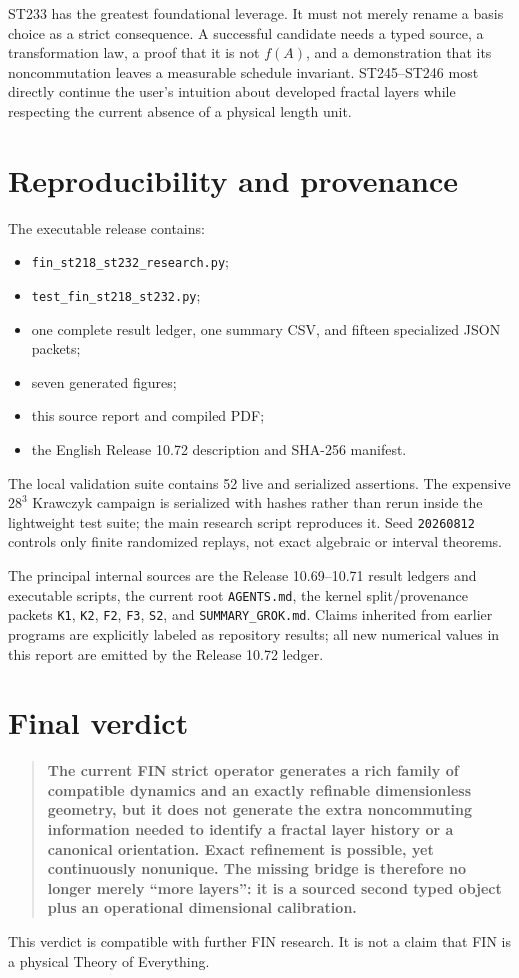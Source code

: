 \documentclass[11pt,a4paper]{article}
\begin{document}
ST233 has the greatest foundational leverage. It must not merely rename a basis choice as a
strict consequence. A successful candidate needs a typed source, a transformation law, a
proof that it is not $f(A)$, and a demonstration that its noncommutation leaves a measurable
schedule invariant. ST245--ST246 most directly continue the user's intuition about developed
fractal layers while respecting the current absence of a physical length unit.

\section{Reproducibility and provenance}

The executable release contains:
\begin{itemize}
\item \texttt{fin\_st218\_st232\_research.py};
\item \texttt{test\_fin\_st218\_st232.py};
\item one complete result ledger, one summary CSV, and fifteen specialized JSON packets;
\item seven generated figures;
\item this source report and compiled PDF;
\item the English Release 10.72 description and SHA-256 manifest.
\end{itemize}

The local validation suite contains 52 live and serialized assertions. The expensive
$28^3$ Krawczyk campaign is serialized with hashes rather than rerun inside the lightweight
test suite; the main research script reproduces it. Seed \texttt{20260812} controls only
finite randomized replays, not exact algebraic or interval theorems.

The principal internal sources are the Release 10.69--10.71 result ledgers and executable
scripts, the current root \texttt{AGENTS.md}, the kernel split/provenance packets
\texttt{K1}, \texttt{K2}, \texttt{F2}, \texttt{F3}, \texttt{S2}, and
\texttt{SUMMARY\_GROK.md}. Claims inherited from earlier programs are explicitly labeled as
repository results; all new numerical values in this report are emitted by the Release
10.72 ledger.

\section{Final verdict}

\begin{quote}
\textbf{The current FIN strict operator generates a rich family of compatible dynamics and
an exactly refinable dimensionless geometry, but it does not generate the extra
noncommuting information needed to identify a fractal layer history or a canonical
orientation. Exact refinement is possible, yet continuously nonunique. The missing bridge
is therefore no longer merely ``more layers'': it is a sourced second typed object plus an
operational dimensional calibration.}
\end{quote}

This verdict is compatible with further FIN research. It is not a claim that FIN is a
physical Theory of Everything.
\end{document}
